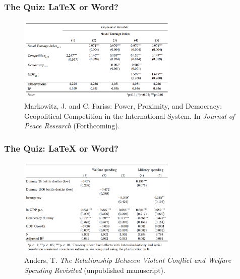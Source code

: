 \documentclass{beamer} %
\begin{document}
\begin{frame}
\frametitle{The Quiz: {\LaTeX} or Word?}
\begin{figure}[htbp]
\begin{center}
\includegraphics[width = 3in]{word3.pdf}
\caption{\tiny Markowitz, J. and C. Fariss: Power, Proximity, and Democracy: Geopolitical Competition in the International System. In \textit{Journal of Peace Research} (Forthcoming).}
\end{center}
\end{figure}
\end{frame}

\begin{frame}
\frametitle{The Quiz: {\LaTeX} or Word?}
\begin{figure}[htbp]
\begin{center}
\includegraphics[width = 3in]{latex3.pdf}
\caption{\tiny Anders, T. \textit{The Relationship Between Violent Conflict and Welfare Spending Revisited} (unpublished manuscript).}
\end{center}
\end{figure}
\end{frame}
 
 
\end{document}
